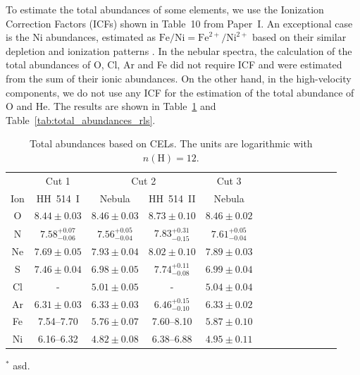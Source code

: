 \documentclass[fleqn,usenatbib]{mnras}
\begin{document}
To estimate the total abundances of some elements, we use the Ionization Correction Factors (ICFs) shown in Table~10 from Paper~I. An exceptional case is the Ni abundances,  estimated as $\text{Fe/Ni}=\text{Fe}^{2+}/\text{Ni}^{2+}$ based on their similar depletion and ionization patterns \citep[][]{mendez2021-2}. In the nebular spectra, the calculation of the total abundances of O, Cl, Ar and Fe did not require ICF and were estimated from the sum of their ionic abundances. On the other hand, in the high-velocity components, we do not use any ICF for the estimation of the total abundance of O and He. The results are shown in Table~\ref{tab:total_abundances_cels} and Table~\ref{tab:total_abundances_rls}.


\begin{table}
\centering
\caption{Total abundances based on CELs.  The units are logarithmic with $n(\text{H})=12$.}
\label{tab:total_abundances_cels}
\begin{tabular}{ccccccccccccc}
\hline
 & \multicolumn{1}{c}{Cut 1} & \multicolumn{2}{c}{Cut 2} & \multicolumn{1}{c}{Cut 3} & \\
Ion &  HH~514~I & Nebula & HH~514~II  & Nebula \\
\hline

O  & $8.44 \pm 0.03$& $8.46 \pm 0.03$&$8.73 \pm 0.10$&$8.46 \pm 0.02$\\

N  & $7.58 ^{+0.07} _{-0.06}$& $7.56 ^{+0.05} _{-0.04}$ & $7.83 ^{+0.31} _{-0.15}$&$7.61 ^{+0.05} _{-0.04}$\\ 

Ne & $7.69 \pm 0.05$ & $7.93 \pm 0.04$ & $8.02 \pm 0.10$&$7.89 \pm 0.03$\\ 

S  & $7.46 \pm 0.04$ & $6.98 \pm 0.05$ & $7.74 ^{+0.11} _{-0.08}$&$6.99 \pm 0.04$\\

Cl & - & $5.01 \pm 0.05$ & - & $5.04 \pm 0.04$\\

Ar & $6.31 \pm 0.03$ & $6.33 \pm 0.03$ & $6.46 ^{+0.15} _{-0.10}$&$6.33 \pm 0.02$\\

Fe & 7.54--7.70 & $5.76 \pm 0.07$ & 7.60--8.10&$5.87 \pm 0.10$\\

Ni & 6.16--6.32 & $4.82 \pm 0.08$ &6.38--6.88& $4.95 \pm 0.11$ \\


\hline
\end{tabular}
\begin{description}
\item $^*$ asd. \\
\end{description}
\end{table}
\end{document}
